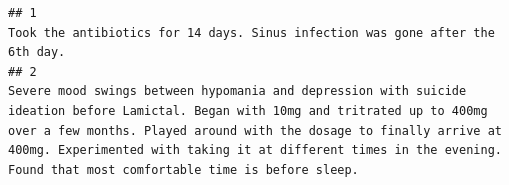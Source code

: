 \documentclass[spanish,]{article}
\begin{document}
\begin{verbatim}
## 1                                                                                                                                                                                                                                                                                                                                                                                                                                                                                                                                                                                                                                                                                                                                                                                                                                                                                                                                                                                                                                                                                                                                                                     Took the antibiotics for 14 days. Sinus infection was gone after the 6th day.
## 2                                                                                                                                                                                                                                                                                                                                                                                                                                                                                                                                                                                                                                                                                                                                                                                                                                                                                                                Severe mood swings between hypomania and depression with suicide ideation before Lamictal. Began with 10mg and tritrated up to 400mg over a few months. Played around with the dosage to finally arrive at 400mg. Experimented with taking it at different times in the evening. Found that most comfortable time is before sleep.

\end{verbatim}
\end{document}
